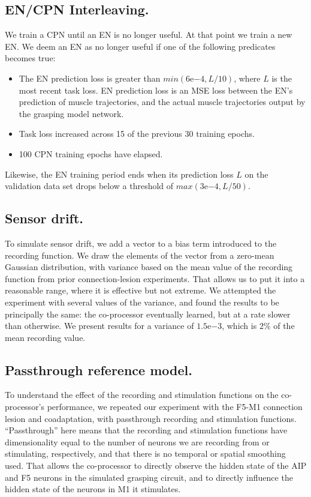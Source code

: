 \documentclass[12pt]{iopart}
\begin{document}
\subsection{EN/CPN Interleaving.}
\label{sup:encpninter}
We train a CPN until an EN is no longer useful. At that point we train a new EN. We deem an EN
as no longer useful if one of the following predicates becomes true:

\begin{itemize}
	\item The EN prediction loss is greater than $min(6\mathrm{e}{-4}, L/10)$, where $L$ is the most recent
	      task loss. EN prediction loss is an MSE loss between the EN's prediction of muscle
	      trajectories, and the actual muscle trajectories output by the grasping model network.
	\item Task loss increased across 15 of the previous 30 training epochs.
	\item 100 CPN training epochs have elapsed.
\end{itemize}

Likewise, the EN training period ends when its prediction loss $L$ on the validation data set drops
below a threshold of $max(3\mathrm{e}{-4}, L/50)$.

\subsection{Sensor drift.}
\label{sup:drift}
To simulate sensor drift, we add a vector to a bias term introduced to the recording function.
We draw the elements of the vector from a zero-mean Gaussian distribution, with variance based
on the mean value of the recording function from prior connection-lesion experiments. That
allows us to put it into a reasonable range, where it is effective but not extreme. We attempted
the experiment with several values of the variance, and found the results to be principally the same:
the co-processor eventually learned, but at a rate slower than otherwise. We present results for
a variance of $1.5\mathrm{e}{-3}$, which is $2\%$ of the mean recording value.

\subsection{Passthrough reference model.}
\label{sup:passthrough}

To understand the effect of the recording and stimulation functions on the co-processor's performance,
we repeated our experiment with the F5-M1 connection lesion and coadaptation, with passthrough recording
and stimulation functions. ``Passthrough'' here means that the recording and stimulation functions have
dimensionality equal to the number of neurons we are recording from or stimulating, respectively, and that
there is no temporal or spatial smoothing used. That allows the co-processor to directly observe the hidden
state of the AIP and F5 neurons in the simulated grasping circuit, and to directly influence the hidden state
of the neurons in M1 it stimulates.
\end{document}
